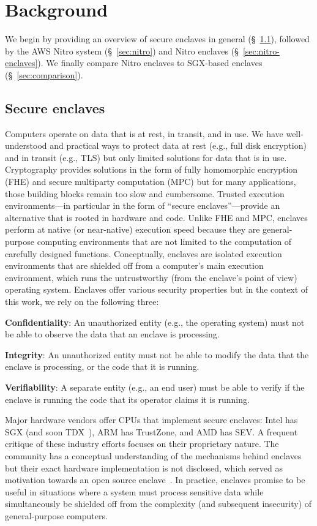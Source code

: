 \section{Background}%
\label{sec:background}

We begin by providing an overview of secure enclaves in general
(\S~\ref{sec:enclaves}), followed by the AWS Nitro system (\S~\ref{sec:nitro})
and Nitro enclaves (\S~\ref{sec:nitro-enclaves}).  We finally compare Nitro
enclaves to SGX-based enclaves (\S~\ref{sec:comparison}).

\subsection{Secure enclaves}%
\label{sec:enclaves}

Computers operate on data that is at rest, in transit, and in use.  We have
well-understood and practical ways to protect data at rest (e.g., full disk
encryption) and in transit (e.g., TLS) but only limited solutions for data that
is in use.  Cryptography provides solutions in the form of fully homomorphic
encryption (FHE) and secure multiparty computation (MPC) but for many
applications, those building blocks remain too slow and cumbersome.  Trusted
execution environments---in particular in the form of ``secure
enclaves''---provide an alternative that is rooted in hardware and code.  Unlike
FHE and MPC, enclaves perform at native (or near-native) execution speed because
they are general-purpose computing environments that are not limited to the
computation of carefully designed functions.  Conceptually, enclaves are
isolated execution environments that are shielded off from a computer's main
execution environment, which runs the untrustworthy (from the enclave's point of
view) operating system.  Enclaves offer various security properties but in the
context of this work, we rely on the following three:

\textbf{Confidentiality}: An unauthorized entity (e.g., the operating system)
must not be able to observe the data that an enclave is processing.

\textbf{Integrity}: An unauthorized entity must not be able to modify the data
that the enclave is processing, or the code that it is running.

\textbf{Verifiability}: A separate entity (e.g., an end user) must be able to
verify if the enclave is running the code that its operator claims it is
running.

Major hardware vendors offer CPUs that implement secure enclaves: Intel has SGX
(and soon TDX~\cite{tdx}), ARM has TrustZone, and AMD has SEV.  A frequent
critique of these industry efforts focuses on their proprietary nature. The
community has a conceptual understanding of the mechanisms behind enclaves but
their exact hardware implementation is not disclosed, which served as motivation
towards an open source enclave~\cite{Lee20a}.  In practice, enclaves promise to
be useful in situations where a system must process sensitive data while
simultaneously be shielded off from the complexity (and subsequent insecurity)
of general-purpose computers.

